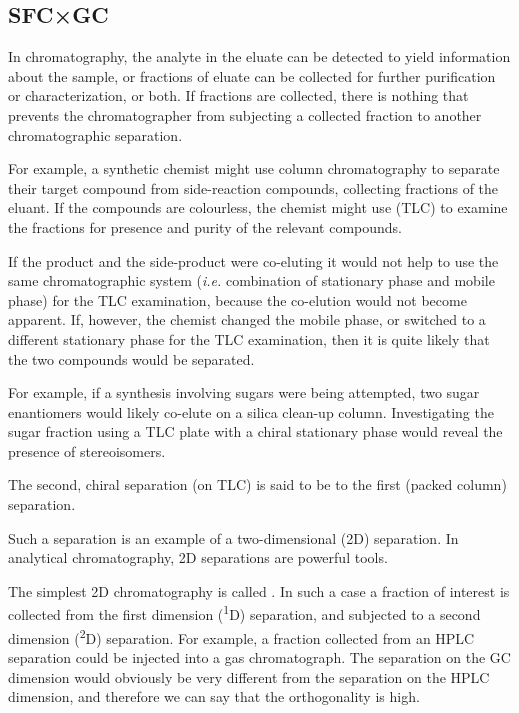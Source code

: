\subsection{SFC×GC}
\label{sec:SFCxGC}
In chromatography, the analyte in the eluate can be detected to yield
information about the sample, or fractions of eluate can be collected for
further purification or characterization, or both. If fractions are collected,
there is nothing that prevents the chromatographer from subjecting a collected
fraction to another chromatographic separation.

For example, a synthetic chemist might use column chromatography to separate
their target compound from side-reaction compounds, collecting fractions of the
eluant. If the compounds are colourless, the chemist might use
 (TLC) to examine the fractions for presence
and purity of the relevant compounds.

If the product and the side-product were co-eluting it would not help to use the
same chromatographic system (\textit{i.e.} combination of stationary phase and
mobile phase) for the TLC examination, because the co-elution would not become
apparent. If, however, the chemist changed the mobile phase, or switched to a
different stationary phase for the TLC examination, then it is quite likely that
the two compounds would be separated. 

For example, if a synthesis involving sugars were being attempted, two sugar
enantiomers would likely co-elute on a silica clean-up column. Investigating the
sugar fraction using a TLC plate with a chiral stationary phase
would reveal the presence of stereoisomers.

The second, chiral separation (on TLC) is said to be  to the
first (packed column) separation.

Such a separation is an example of a two-dimensional (2D) separation. In
analytical chromatography, 2D separations are powerful tools.

The simplest 2D chromatography is called . In such a case
a fraction of interest is collected from the first dimension
(\textsuperscript{1}D) separation, and subjected to a second dimension
(\textsuperscript{2}D) separation. For example, a fraction collected from an
HPLC separation could be injected into a gas chromatograph. The separation on
the GC dimension would obviously be very different from the separation on the
HPLC dimension, and therefore we can say that the orthogonality is high.

